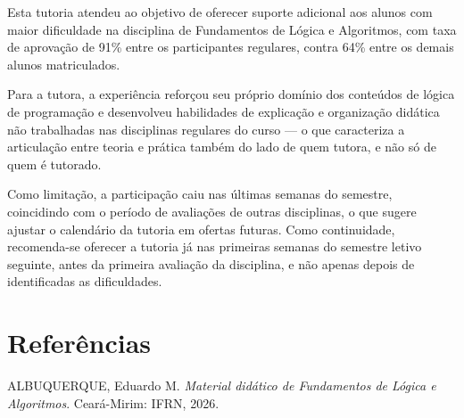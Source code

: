 \documentclass[article,12pt,a4paper]{abntex2}
\begin{document}
Esta tutoria atendeu ao objetivo de oferecer suporte adicional aos alunos
com maior dificuldade na disciplina de Fundamentos de Lógica e Algoritmos,
com taxa de aprovação de 91\% entre os participantes regulares, contra 64\%
entre os demais alunos matriculados.

Para a tutora, a experiência reforçou seu próprio domínio dos conteúdos de
lógica de programação e desenvolveu habilidades de explicação e
organização didática não trabalhadas nas disciplinas regulares do curso —
o que caracteriza a articulação entre teoria e prática também do lado de
quem tutora, e não só de quem é tutorado.

Como limitação, a participação caiu nas últimas semanas do semestre,
coincidindo com o período de avaliações de outras disciplinas, o que
sugere ajustar o calendário da tutoria em ofertas futuras. Como
continuidade, recomenda-se oferecer a tutoria já nas primeiras semanas do
semestre letivo seguinte, antes da primeira avaliação da disciplina, e não
apenas depois de identificadas as dificuldades.

\postextual

\section*{Referências}

\newcommand{\referencia}[1]{\par\noindent\hangindent=1cm #1\par\medskip}

\referencia{ALBUQUERQUE, Eduardo M. \textit{Material didático de
Fundamentos de Lógica e Algoritmos}. Ceará-Mirim: IFRN, 2026.}
\end{document}

